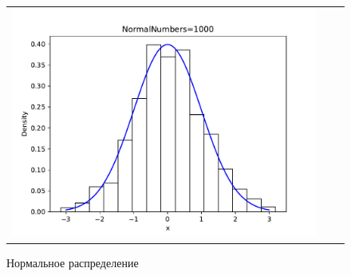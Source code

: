 \begin{figure}[H]
\begin{tabular}{ccc}
		\includegraphics[scale=0.33]{normal_hist_1000.pdf}
	\end{tabular}
	\caption{Нормальное распределение}
\end{figure}

